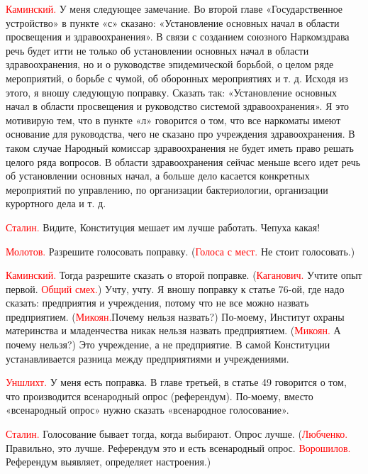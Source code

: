 \documentclass{kursa4}
\begin{document}
{{    \textcolor{red}{Каминский.}{
    У меня следующее замечание. Во второй главе «Государственное
    устройство» в пункте «с» сказано: «Установление основных начал в
    области просвещения и здравоохранения». В связи с созданием союзного
    Наркомздрава речь будет итти не только об установлении основных начал в
    области здравоохранения, но и о руководстве эпидемической борьбой, о
    целом ряде мероприятий, о борьбе с чумой, об оборонных мероприятиях и
    т. д. Исходя из этого, я вношу следующую поправку. Сказать так:
    «Установление основных начал в области просвещения и руководство
    системой здравоохранения». Я это мотивирую тем, что в пункте «л»
    говорится о том, что все наркоматы имеют основание для руководства,
    чего не сказано про учреждения здравоохранения. В таком случае Народный
    комиссар здравоохранения не будет иметь право решать целого ряда
    вопросов. В области здравоохранения сейчас меньше всего идет речь об
    установлении основных начал, а больше дело касается конкретных
    мероприятий по управлению, по организации бактериологии, организации
    курортного дела и т. д.}

    \textcolor{red}{Сталин.}{
    Видите, Конституция мешает им лучше работать. Чепуха какая!}

    \textcolor{red}{Молотов.}{
    Разрешите голосовать поправку.
    (}\textcolor{red}{Голоса с
    мест.}{ Не стоит голосовать.)}

    \textcolor{red}{Каминский.}{
    Тогда разрешите сказать о второй поправке.
    (}\textcolor{red}{Каганович.}{
    Учтите опыт первой.
    }\textcolor{red}{Общий
    смех.}{) Учту, учту. Я вношу поправку к статье 76-ой,
    где надо сказать: предприятия и учреждения, потому что не все можно
    назвать предприятием.
    (}\textcolor{red}{Микоян.}{Почему
    нельзя назвать?) По-моему, Институт охраны материнства и младенчества
    никак нельзя назвать предприятием.
    (}\textcolor{red}{Микоян.}{
    А почему нельзя?) Это учреждение, а не предприятие. В самой Конституции
    устанавливается разница между предприятиями и учреждениями.}

    \textcolor{red}{Уншлихт.}{
    У меня есть поправка. В главе третьей, в статье 49 говорится о том, что
    производится всенародный опрос (референдум). По-моему, вместо
    «всенародный опрос» нужно сказать «всенародное голосование».}

    \textcolor{red}{Сталин.}{
    Голосование бывает тогда, когда выбирают. Опрос лучше.
    (}\textcolor{red}{Любченко.}{
    Правильно, это лучше. Референдум это и есть всенародный
    опрос.} \textcolor{red}{Ворошилов.} Референдум выявляет, определяет
    настроения.)

}}
\end{document}
